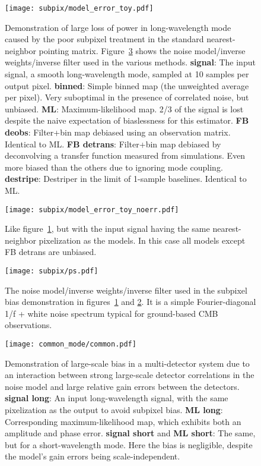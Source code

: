 \documentclass[twocolumn,apj]{aastex63}
\newcommand{\dfn}[1]{\textbf{#1}}
\begin{document}
\begin{figure}
	\centering
	\texttt{[image: subpix/model\_error\_toy.pdf]}
	\caption{
		Demonstration of large loss of power in long-wavelength mode
		caused by the poor subpixel treatment in the standard nearest-neighbor pointing matrix.
		Figure~\ref{fig:ps} shows the noise model/inverse weights/inverse filter
		used in the various methods.
		\dfn{signal}: The input signal, a smooth long-wavelength mode,
		sampled at 10 samples per output pixel.
		\dfn{binned}: Simple binned map (the unweighted average per pixel).
		Very suboptimal in the presence of correlated noise, but unbiased.
		\dfn{ML}: Maximum-likelihood map. 2/3 of the signal is lost despite
		the naive expectation of biaslessness for this estimator.
		\dfn{FB deobs}: Filter+bin map debiased using an observation matrix.
		Identical to ML.
		\dfn{FB detrans}: Filter+bin map debiased by deconvolving a
		transfer function measured from simulations. Even more biased
		than the others due to ignoring mode coupling.
		\dfn{destripe}: Destriper in the limit of 1-sample baselines.
		Identical to ML.
	}
	\label{fig:subpix-bias}
\end{figure}

\begin{figure}
	\centering
	\texttt{[image: subpix/model\_error\_toy\_noerr.pdf]}
	\caption{
		Like figure~\ref{fig:subpix-bias}, but with the input signal
		having the same nearest-neighbor pixelization as the models.
		In this case all models except FB detrans are unbiased.
	}
	\label{fig:subpix-noerr}
\end{figure}

\begin{figure}
	\centering
	\texttt{[image: subpix/ps.pdf]}
	\caption{
		The noise model/inverse weights/inverse filter used in the subpixel
		bias demonstration in figures~\ref{fig:subpix-bias} and \ref{fig:subpix-noerr}.
		It is a simple Fourier-diagonal 1/f + white noise spectrum
		typical for ground-based CMB observations.
	}
	\label{fig:ps}
\end{figure}

\begin{figure}
	\centering
	\texttt{[image: common\_mode/common.pdf]}
	\caption{
		Demonstration of large-scale bias in a multi-detector system
		due to an interaction between strong large-scale
		detector correlations in the noise model and large
		relative gain errors between the detectors.
		\dfn{signal long}: An input long-wavelength signal,
		with the same pixelization as the output to avoid subpixel bias.
		\dfn{ML long}: Corresponding maximum-likelihood map, which
		exhibits both an amplitude and phase error.
		\dfn{signal short} and \dfn{ML short}: The same, but for a
		short-wavelength mode. Here the bias is negligible,
		despite the model's gain errors being scale-independent.
	}
	\label{fig:common}
\end{figure}



\end{document}
